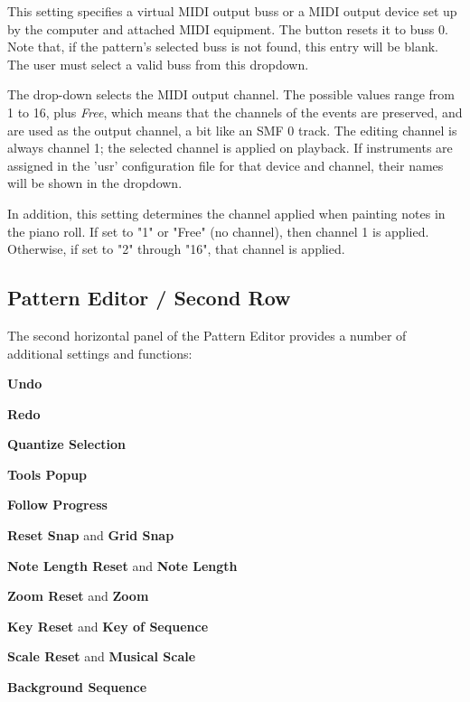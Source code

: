    This setting specifies a virtual MIDI output buss or a
   MIDI output device set up by the computer and
   attached MIDI equipment.
   The button resets it to buss 0.
   Note that, if the pattern's selected buss is not found, this entry will be
   blank.  The user must select a valid buss from this dropdown.

   The drop-down selects the MIDI output channel.
   The possible values range from 1 to 16, plus \textsl{Free}, which means
   that the channels of the events are preserved, and are used as the output
   channel, a bit like an SMF 0 track.
   The editing channel is always channel 1; the selected channel is applied
   on playback.
   If instruments are assigned in the 'usr' configuration file
   for that device and channel, their names will be shown in the dropdown.

   In addition, this setting determines the channel applied when painting notes
   in the piano roll.  If set to "1" or "Free" (no channel), then channel 1 is
   applied.  Otherwise, if set to "2" through "16", that channel is applied.

\subsection{Pattern Editor / Second Row}
\label{subsec:pattern_editor_second_row}

   The second horizontal panel of the Pattern Editor provides a number
   of additional settings and functions:

   \begin{enumber}
      \item \textbf{Undo}
      \item \textbf{Redo}
      \item \textbf{Quantize Selection}
      \item \textbf{Tools Popup}
      \item \textbf{Follow Progress}
      \item \textbf{Reset Snap} and \textbf{Grid Snap}
      \item \textbf{Note Length Reset} and \textbf{Note Length}
      \item \textbf{Zoom Reset} and \textbf{Zoom}
      \item \textbf{Key Reset} and \textbf{Key of Sequence}
      \item \textbf{Scale Reset} and \textbf{Musical Scale}
      \item \textbf{Background Sequence}
   \end{enumber}

